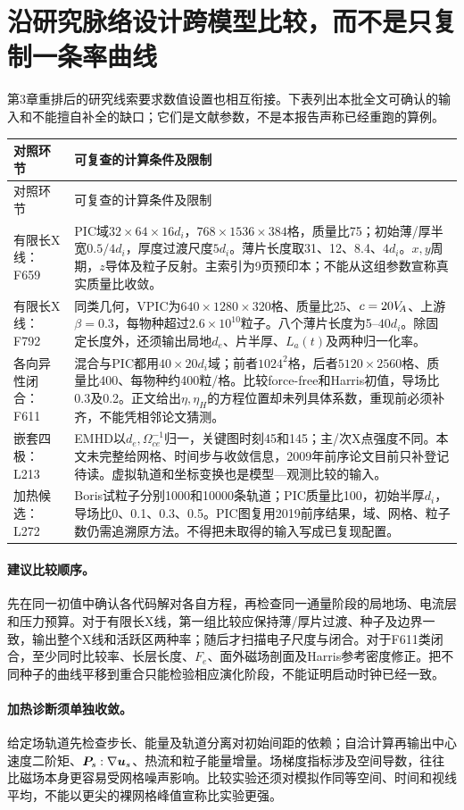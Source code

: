 \section{沿研究脉络设计跨模型比较，而不是只复制一条率曲线}
第3章重排后的研究线索要求数值设置也相互衔接。下表列出本批全文可确认的输入和不能擅自补全的缺口；它们是文献参数，不是本报告声称已经重跑的算例。
\begin{longtable}{P{29mm}P{119mm}}
\toprule 对照环节 & 可复查的计算条件及限制\\\midrule\endfirsthead
\toprule 对照环节 & 可复查的计算条件及限制\\\midrule\endhead
有限长X线：F659 &
PIC域$32\times64\times16d_i$，$768\times1536\times384$格，质量比75；初始薄/厚半宽$0.5/4d_i$，厚度过渡尺度$5d_i$。薄片长度取31、12、8.4、$4d_i$。$x,y$周期，$z$导体及粒子反射。主索引为9页预印本；不能从这组参数宣称真实质量比收敛。\\
有限长X线：F792 &
同类几何，VPIC为$640\times1280\times320$格、质量比25、$c=20V_{\!A}$、上游$\beta=0.3$，每物种超过$2.6\times10^{10}$粒子。八个薄片长度为5--$40d_i$。除固定长度外，还须输出局地$d_e$、片半厚、$L_a(t)$及两种归一化率。\\
各向异性闭合：F611 &
混合与PIC都用$40\times20d_i$域；前者$1024^2$格，后者$5120\times2560$格、质量比400、每物种约400粒/格。比较force-free和Harris初值，导场比0.3及0.2。正文给出$\eta,\eta_H$的方程位置却未列具体系数，重现前必须补齐，不能凭相邻论文猜测。\\
嵌套四极：L213 &
EMHD以$d_e,\Omega_{ce}^{-1}$归一，关键图时刻45和145；主/次X点强度不同。本文未完整给网格、时间步与收敛信息，2009年前序论文目前只补登记待读。虚拟轨道和坐标变换也是模型—观测比较的输入。\\
加热候选：L272 &
Boris试粒子分别1000和10000条轨道；PIC质量比100，初始半厚$d_i$，导场比0、0.1、0.3、0.5。PIC图复用2019前序结果，域、网格、粒子数仍需追溯原方法。不得把未取得的输入写成已复现配置。\\
\bottomrule
\end{longtable}
\citep{F659,F792,F611,L213,L272}

\paragraph{建议比较顺序。}
先在同一初值中确认各代码解对各自方程，再检查同一通量阶段的局地场、电流层和压力预算。对于有限长X线，第一组比较应保持薄/厚片过渡、种子及边界一致，输出整个X线和活跃区两种率；随后才扫描电子尺度与闭合。对于F611类闭合，至少同时比较率、长层长度、$F_e$、面外磁场剖面及Harris参考密度修正。把不同种子的曲线平移到重合只能检验相应演化阶段，不能证明启动时钟已经一致。

\paragraph{加热诊断须单独收敛。}
给定场轨道先检查步长、能量及轨道分离对初始间距的依赖；自洽计算再输出中心速度二阶矩、$\bm{P}_s:\nabla\bm{u}_s$、热流和粒子能量增量。场梯度指标涉及空间导数，往往比磁场本身更容易受网格噪声影响。比较实验还须对模拟作同等空间、时间和视线平均，不能以更尖的裸网格峰值宣称比实验更强。
